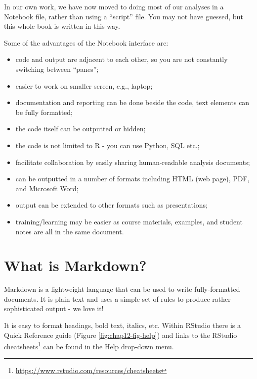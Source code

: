 \documentclass[
  12pt,
  krantz2]{krantz}
\providecommand{\tightlist}{%
  \setlength{\itemsep}{0pt}\setlength{\parskip}{0pt}}
\renewcommand{\href}[2]{#2\footnote{\url{#1}}}
\begin{document}
In our own work, we have now moved to doing most of our analyses in a Notebook file, rather than using a ``script'' file. You may not have guessed, but this whole book is written in this way.

Some of the advantages of the Notebook interface are:

\begin{itemize}
\tightlist
\item
  code and output are adjacent to each other, so you are not constantly switching between ``panes'';
\item
  easier to work on smaller screen, e.g., laptop;
\item
  documentation and reporting can be done beside the code, text elements can be fully formatted;
\item
  the code itself can be outputted or hidden;
\item
  the code is not limited to R - you can use Python, SQL etc.;
\item
  facilitate collaboration by easily sharing human-readable analysis documents;
\item
  can be outputted in a number of formats including HTML (web page), PDF, and Microsoft Word;
\item
  output can be extended to other formats such as presentations;
\item
  training/learning may be easier as course materials, examples, and student notes are all in the same document.
\end{itemize}

\hypertarget{what-is-markdown}{%
\section{What is Markdown?}\label{what-is-markdown}}

Markdown is a lightweight language that can be used to write fully-formatted documents.
It is plain-text and uses a simple set of rules to produce rather sophisticated output - we love it!

It is easy to format headings, bold text, italics, etc.
Within RStudio there is a Quick Reference guide (Figure \ref{fig:chap12-fig-help}) and links to the \href{https://www.rstudio.com/resources/cheatsheets}{RStudio cheatsheets} can be found in the Help drop-down menu.
\end{document}
